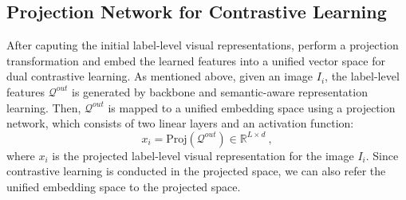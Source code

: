 \documentclass{ecai}
\begin{document}
\subsection{Projection Network for Contrastive Learning}
\label{PNCL}
After caputing the initial label-level visual representations, perform a projection transformation and embed the learned features into a unified vector space for dual contrastive learning. As mentioned above,
given an image $I_i$, the label-level features $\mathcal{Q}^{out}$ is generated by backbone and semantic-aware representation learning. Then, $\mathcal{Q}^{out}$ is mapped to a unified embedding space using a projection network, which consists of two linear layers and an activation function:
\begin{equation}
	x_{i} = \text{Proj}(\mathcal{Q}^{out}) \in \mathbb{R}^{L\times d}~,
\end{equation}
where $x_{i}$ is the projected label-level visual representation for the image $I_i$.
Since contrastive learning is conducted in the projected space, we can also refer the unified embedding space to the projected space.	
\end{document}
